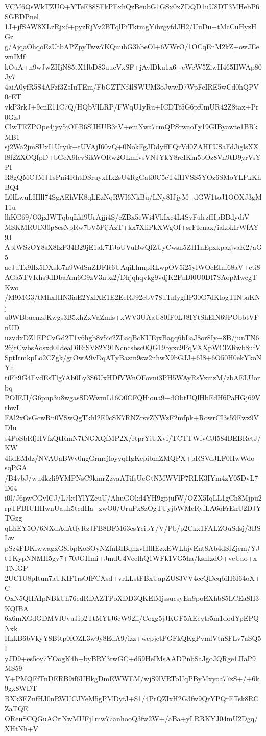 VCM6QsWkTZUO+YTeE88SFkPExhQzBeubG1GSx0xZDQD1uU8DT3MHebP6SGBDPnel
1J+jfSAW8XLzRjx6+pyzRjYv2BTqlPiTktmgYibrgyfdJH2/UuDu+tMcCuHyzHGz
g/AjqaOhqoEzUtbAPZpyTww7KQuubG3hbeOl+6VWrO/1OCqEnM2kZ+owJEewnIMf
kOuA+n9wJwZHjN85tX1lbD83uucVxSF+jAvlDku1x6+cWeW5ZiwH465HWAp80Jy7
4aiA0yfR5S4AFzf3ZsIuTEm/FbGZTNf4lSWUM3oJwwD7WpFcIRE5wCd0hQPV0cET
vkP3rkJ+9cnE11C7Q/HQbVlLRP/FWqU1yRu+ICDTf5G6pf0mUR42Z8tax+Pr0GzJ
ClwTEZPOpe4jyy5jOEB6SlIHUB3tV+emNwa7cmQPSrwaoFy19GIByawte1BRkMB1
sj2Wa2jmSUxI1Uryik+tUVAjI60vQ+0NokFgJDdyffEQrVd0ZAHFUSaFdJiglsXX
l8f2ZXOQfpD+bGeX9lcvSikWORw2OLmfvsVNJYkY8rcIKm5bOz8Vn9tD9yrVsYPI
R8gQMCJMJTsPni4RhtDSruyxHx2sU4RgGati0C5cT4fHVSS5YOz6SMoYLPkKhBQ4
L0lLwuLHIll74SgAEhVK8qLEzNqRWI6NkBu/LNy8IJjyM+dGW1toJ1OOXJ3gM11u
lhKG69/O3jxlWTqbqLkf9UrAjji4S/cZBx5eWi4VkIxc4L4SvFulrzfHpBBdydiV
MSKMRUD30p8esNpRw7bV5PijAzT+kx7XliPkXWgOf+srFIenax/iakokIrWfAY9J
AblWSzOY8sX8IzP34B29jE1ak7TJoUVuBwQfZUyCwsn5ZH1nEpxkpazjvaK2/aG5
aeJuTx9Ilx5DXslo7n9WdSnZDFR6UAqiLhmpRLwpOV5i25ylWOcEInf68aV+cti8
AGa5TVKhs9dDbaAm6G9zV3nbz2/Dhjqhqvkg9vdjK2FuDl0U0DI7SAopMwcgTKwo
/M9MG3/tMhxHIN3iaE2YxlXE1E2EeRJ92ebV78uTnlygfIP30G7dKlogTINbaKNj
u0WBbuenzJKwgs3B5xhZxVaZmis+xWV3UAaU80fF0LJ8IYtShElN69PObbtVFnUD
uzvdxDZ1EPCvGd2T1v6hgb8v5ic2ZLaqBcKUEjxBagq6bLaJ8or8Iy+8B/junTN6
26jrCwbsAosxd0LteaDiEtSV82Y91Ncncsbsc0QG19byxc9PqVXXpWCIZRwb8ufV
SptIrmkpLo2CZgk/gtOwA9vDqATyBazm9sw2nhwX9bGJJ+6I8+6O50H0ekYkoNYh
tiFh9G4EvdEsTlg7Ab0Ly3S6UxHDfVWnOFovni3PH5WAyRsVzuizM/zbAELUorbq
POIFJI/G6pnp3u8wgasSDWwmL16O0CFQHioua9+dObtUQlHbEdH6PaHGj69VthwL
FAl2xOsGcwRn0VSwQgTkhl2E9cSK7RNZrsvZNWzF2mfpk+RowrCI3s59Ewz9VDIu
s4PoSbRfjHVfzQtRmN7tNGXQfMP2X/rtprYiUXvf/TCTTWfvCJl584BEBRetJ/KW
4fidEMdz/NVAUaBWv0ngGrmcjloyyqHgKepibmZMQPX+pRSVdJLF0HwWdo+sqPGA
/B4vbJ/wu4kzli9YMPNsC9kmrZzvaATifsUcGtNMWVlP7RLK3IYm4zY05DvL7D64
i0l/J6pwCGylCJ/L7ktlYlYZcuU/AhuGOkd4YH9gpjufW/OZX5IqLL1gCh8Mjpu2
rpTFBIUHHwnUauh5tcdHa+zwO0/UruPx8zOgTUyjbWMcRyfLA6oFrEnU2DJYTGzg
qLhEY5O/6NXdAdAtfyRzJFB8BFM63csYcibY/V/Pb/p2Ckx1FALZOuSdsj/3BSLw
pSz4FDKlwwagxG8fbpKoSOyNZfnBIBqnzvHflIEzxEWLhjvEnt8Ab4dSfZjem/YJ
tTKypNNMH5gv7+70JGHmi+JmdU4VeelhQ1WFk1VG5ha/kshlzdO+vcUao+xTNfGP
2UC1U8pItun7aUKIF1rsOfFCXsd+vrLLstFBxUapZU83VV4ccQDcqbiH6I64oX+C
OxN5QHAIpNBkUh76edRDAZTPoXDD3QKElMjssucsyEn9poEXhb85LCEa8H3KQIBA
6x6mXGdGDMVlUvuJip2TtMYtJ6cW92ii/Cogg5jJKGF5AEeytr5m1dodYpEPQNxk
HkkB6bVkyY8Bttp0fOZL3w9y8EdA9/izz+wcpjetPGFkQKgPvmlVtn8FLv7aSQ5I
yJD9+es5ov7YOogK4h+byBRY3twGC+d59HeIMsAADPnbSaJgoJQRge1JIaP9MS59
Y+PMQFfTnDERB9if6UHkgDmEWWEM/wjS9lVRToUqPByMxyoa77zS+/+6k9gx8WDT
BXk3EZnfHJ0nRWUCJYeM5gPMDyfJ+S1/4PrQZIxH2G3fw9QrYPQrETsk8RCZaTQE
OReuSCQGuACriNwMUFj1mw77anhooQ3fw2W+/aBa+yLRRKYJ04mU2Dgq/XHtNh+V
